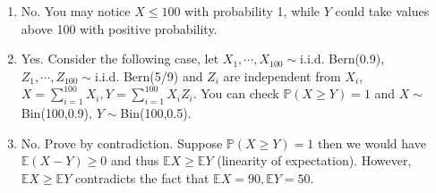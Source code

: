 
\setcounter{theorem}{19}
\begin{exercise} [BH.4.20]
\begin{solution}
    \begin{enumerate}
        \item No. You may notice $X\leq 100$ with probability 1, while $Y$ could take values above 100 with positive probability.
        \item Yes. Consider the following case, let $X_1, \cdots, X_{100}\sim$i.i.d. Bern(0.9), $Z_1, \cdots, Z_{100}\sim$i.i.d. Bern(5/9) and $Z_i$ are independent from $X_i$,  $X=\sum_{i=1}^{100} X_i, Y=\sum_{i=1}^{100}X_iZ_i$. You can check $\mathbb{P}(X\geq Y)=1$ and $X\sim$Bin(100,0.9), $Y\sim$Bin(100,0.5).
        \item No. Prove by contradiction. Suppose $\mathbb{P}(X\geq Y) =1$ then we would have $\mathbb{E}(X-Y) \geq 0$ and thus 
        $\mathbb{E}X\geq \mathbb{E}Y$ (linearity of expectation). However, $\mathbb{E}X\geq \mathbb{E}Y$ contradicts the fact that $\mathbb{E}X=90, \mathbb{E}Y=50$.
    \end{enumerate}
\end{solution}
\end{exercise}

